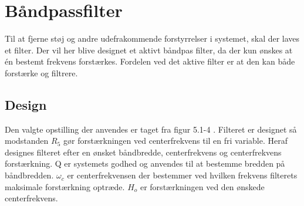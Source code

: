 \section{Båndpassfilter}\label{sec:filter}
Til at fjerne støj og andre udefrakommende forstyrrelser i systemet, skal der laves et filter.
Der vil her blive designet et aktivt båndpas filter, da der kun ønskes at én bestemt frekvens forstærkes.
Fordelen ved det aktive filter er at den kan både forstærke og filtrere.

\subsection{Design}
Den valgte opstilling der anvendes er taget fra figur 5.1-4 \cite[side. 208]{Huelsman1993}.
Filteret er designet så modstanden $R_5$ gør forstærkningen ved centerfrekvens til en fri variable.
Heraf designes filteret efter en ønsket båndbredde, centerfrekvens og centerfrekvens forstærkning. Q er systemets godhed og anvendes til at bestemme bredden på båndbredden. 
$\omega_c$ er centerfrekvensen der bestemmer ved hvilken frekvens filterets maksimale forstærkning optræde.
$H_o$ er forstærkningen ved den ønskede centerfrekvens.
